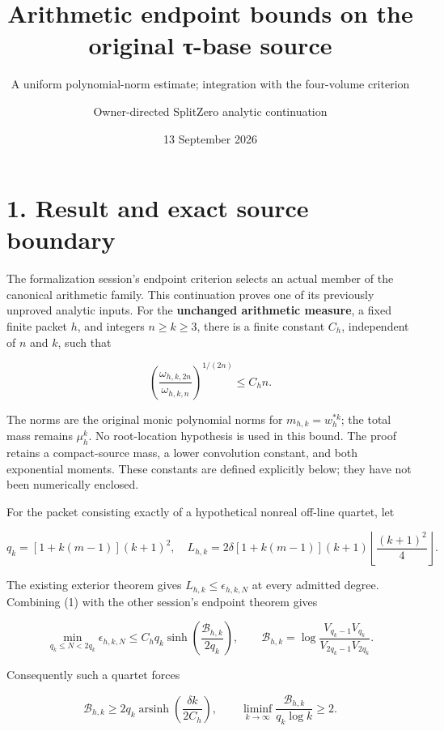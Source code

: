 \documentclass[
  11pt,
]{article}
\title{Arithmetic endpoint bounds on the original τ-base source}
\subtitle{A uniform polynomial-norm estimate; integration with the
four-volume criterion}
\author{Owner-directed SplitZero analytic continuation}
\date{13 September 2026}
\begin{document}
\maketitle

{
\setcounter{tocdepth}{3}
\tableofcontents
}
\section{1. Result and exact source
boundary}\label{result-and-exact-source-boundary}

The formalization session's endpoint criterion selects an actual member
of the canonical arithmetic family. This continuation proves one of its
previously unproved analytic inputs. For the \textbf{unchanged
arithmetic measure}, a fixed finite packet \(h\), and integers
\(n\ge k\ge3\), there is a finite constant \(C_h\), independent of \(n\)
and \(k\), such that

\[
 \boxed{\left(\frac{\omega_{h,k,2n}}{\omega_{h,k,n}}\right)^{1/(2n)}
       \le C_h n.}                                                    \tag{1}
\]

The norms are the original monic polynomial norms for
\(m_{h,k}=w_h^{*k}\); the total mass remains \(\mu_h^k\). No
root-location hypothesis is used in this bound. The proof retains a
compact-source mass, a lower convolution constant, and both exponential
moments. These constants are defined explicitly below; they have not
been numerically enclosed.

For the packet consisting exactly of a hypothetical nonreal off-line
quartet, let

\[
 q_k=[1+k(m-1)](k+1)^2,
 \quad
 L_{h,k}=2\delta[1+k(m-1)](k+1)
                 \left\lfloor\frac{(k+1)^2}{4}\right\rfloor.             \tag{2}
\]

The existing exterior theorem gives \(L_{h,k}\le\epsilon_{h,k,N}\) at
every admitted degree. Combining (1) with the other session's endpoint
theorem gives

\[
 \boxed{\min_{q_k\le N<2q_k}\epsilon_{h,k,N}
 \le C_hq_k\sinh\!\left(\frac{\mathcal B_{h,k}}{2q_k}\right),\qquad
 \mathcal B_{h,k}=\log\frac{V_{q_k-1}V_{q_k}}
                              {V_{2q_k-1}V_{2q_k}}.}                    \tag{3}
\]

Consequently such a quartet forces

\[
 \boxed{\mathcal B_{h,k}\ge
 2q_k\operatorname{arsinh}\!\left(\frac{\delta k}{2C_h}\right),\qquad
 \liminf_{k\to\infty}\frac{\mathcal B_{h,k}}{q_k\log k}\ge2.}           \tag{4}
\]
\end{document}
